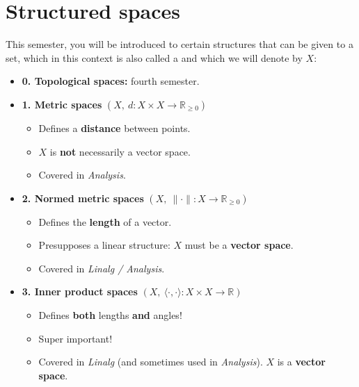 
\section{Structured spaces}
\label{sec:structured_spaces}

This semester, you will be introduced to certain structures that can be given to a set, which in
this context is also called a   and which we will denote by $X$:

\begin{itemize}
  \item \textbf{0. Topological spaces:} fourth semester.
  \item \textbf{1. Metric spaces} $(X,\ d : X \times X \to \mathbb{R}_{\geq 0})$
    \begin{itemize}
      \item Defines a \textbf{distance} between points.
      \item $X$ is \textbf{not} necessarily a vector space.
      \item Covered in \textit{Analysis}.
    \end{itemize}
  \item \textbf{2. Normed metric spaces} $(X,\ \|\cdot\| : X \to \mathbb{R}_{\geq 0})$
    \begin{itemize}
      \item Defines the \textbf{length} of a vector.
      \item Presupposes a linear structure: $X$ must be a \textbf{vector space}.
      \item Covered in \textit{Linalg / Analysis}.
    \end{itemize}
  \item \textbf{3. Inner product spaces} $(X,\ \langle\cdot,\cdot\rangle : X \times X \to \mathbb{R})$
    \begin{itemize}
      \item Defines \textbf{both} lengths \textbf{and} angles!
      \item Super important!
      \item Covered in \textit{Linalg} (and sometimes used in \textit{Analysis}). $X$ is a \textbf{vector space}.
    \end{itemize}
\end{itemize}

